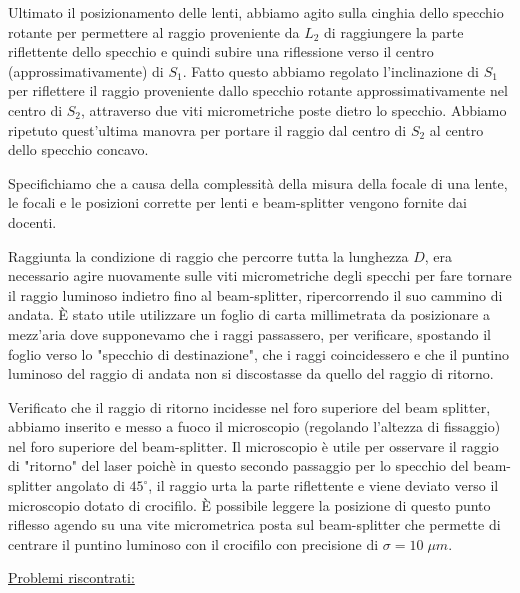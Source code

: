 \documentclass{article}
\begin{document}
\vspace{3mm}

Ultimato il posizionamento delle lenti, abbiamo agito sulla cinghia dello specchio rotante per permettere al raggio proveniente da $L_2$ di raggiungere la parte riflettente 
dello specchio e quindi subire una riflessione verso il centro (approssimativamente) di $S_1$.
Fatto questo abbiamo regolato l'inclinazione di $S_1$ per riflettere il raggio proveniente dallo specchio rotante approssimativamente nel centro di $S_2$, attraverso due
viti micrometriche poste dietro lo specchio. Abbiamo ripetuto quest'ultima manovra per portare il raggio dal centro di $S_2$ al centro dello specchio concavo.

Specifichiamo che a causa della complessità della misura della focale di una lente, le focali e le posizioni corrette per lenti e beam-splitter vengono fornite dai 
docenti.

\vspace{3mm}

Raggiunta la condizione di raggio che percorre tutta la lunghezza $D$, era necessario agire nuovamente sulle viti micrometriche degli specchi per fare tornare il raggio
luminoso indietro fino al beam-splitter, ripercorrendo il suo cammino di andata. È stato utile utilizzare un foglio di carta millimetrata da posizionare
a mezz'aria dove supponevamo che i raggi passassero, per verificare, spostando il foglio verso lo "specchio di destinazione", che i raggi coincidessero e che il puntino luminoso
del raggio di andata non si discostasse da quello del raggio di ritorno.

\vspace{3mm}

Verificato che il raggio di ritorno incidesse nel foro superiore del beam splitter, abbiamo inserito e messo a fuoco il microscopio (regolando l'altezza di fissaggio) nel
foro superiore del beam-splitter. Il microscopio è utile per osservare il raggio di "ritorno" del laser poichè in questo secondo passaggio per lo specchio del beam-splitter
angolato di $45^\circ$, il raggio urta la parte riflettente e viene deviato verso il microscopio dotato di crocifilo. È possibile leggere la posizione di questo punto 
riflesso agendo su una vite micrometrica posta sul beam-splitter che permette di centrare il puntino luminoso con il crocifilo con precisione di $\sigma = 10 \; \mu m$.

\vspace{3mm}

\underline{Problemi riscontrati:} 
\end{document}
